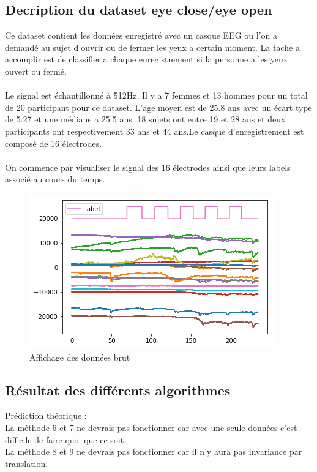 \documentclass{article}[12pt]
\begin{document}
\subsection{Decription du dataset eye close/eye open}
Ce dataset contient les données enregistré avec un casque EEG ou l'on a demandé au sujet d'ouvrir ou de fermer les yeux a certain moment. La tache a accomplir est de classifier a chaque enregistrement si la personne a les yeux ouvert ou fermé.\\
\\
Le signal est échantillonné à 512Hz. Il y a 7 femmes et 13 hommes pour un total de 20 participant pour ce dataset. L'age moyen est de 25.8 ans avec un écart type de 5.27 et une médiane a 25.5 ans. 18 sujets ont entre 19 et 28 ans et deux participants ont respectivement 33 ans et 44 ans.Le casque d'enregistrement est composé de 16 électrodes.\\
\\
On commence par visualiser le signal des 16 électrodes ainsi que leurs labels associé au cours du temps.\\
\begin{figure}[H]
\begin{center}
\includegraphics[scale=0.8]{images/donnees_entree.png}
\end{center}
\caption{Affichage des données brut}
\end{figure}

\subsection{Résultat des différents algorithmes}
Prédiction théorique : \\
La méthode 6 et 7 ne devrais pas fonctionner car avec une seule données c'est difficile de faire quoi que ce soit.\\
La méthode 8 et 9 ne devrais pas fonctionner car il n'y aura pas invariance par translation.\\
\end{document}

